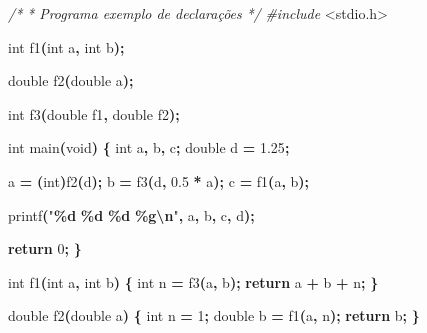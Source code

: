 \documentclass[
  11pt,
  a4paper,
]{scrbook}
\newenvironment{Shaded}{\begin{snugshade}}{\end{snugshade}}
\newcommand{\CommentTok}[1]{\textcolor[rgb]{0.56,0.35,0.01}{\textit{#1}}}
\newcommand{\ControlFlowTok}[1]{\textcolor[rgb]{0.13,0.29,0.53}{\textbf{#1}}}
\newcommand{\DataTypeTok}[1]{\textcolor[rgb]{0.13,0.29,0.53}{#1}}
\newcommand{\DecValTok}[1]{\textcolor[rgb]{0.00,0.00,0.81}{#1}}
\newcommand{\FloatTok}[1]{\textcolor[rgb]{0.00,0.00,0.81}{#1}}
\newcommand{\ImportTok}[1]{#1}
\newcommand{\NormalTok}[1]{#1}
\newcommand{\OperatorTok}[1]{\textcolor[rgb]{0.81,0.36,0.00}{\textbf{#1}}}
\newcommand{\PreprocessorTok}[1]{\textcolor[rgb]{0.56,0.35,0.01}{\textit{#1}}}
\newcommand{\SpecialCharTok}[1]{\textcolor[rgb]{0.81,0.36,0.00}{\textbf{#1}}}
\newcommand{\StringTok}[1]{\textcolor[rgb]{0.31,0.60,0.02}{#1}}
\begin{document}
\begin{Shaded}
\begin{Highlighting}[]
\CommentTok{/*}
\CommentTok{ * Programa exemplo de declarações}
\CommentTok{ */}
\PreprocessorTok{\#include }\ImportTok{\textless{}stdio.h\textgreater{}}

\DataTypeTok{int}\NormalTok{ f1}\OperatorTok{(}\DataTypeTok{int}\NormalTok{ a}\OperatorTok{,} \DataTypeTok{int}\NormalTok{ b}\OperatorTok{);}

\DataTypeTok{double}\NormalTok{ f2}\OperatorTok{(}\DataTypeTok{double}\NormalTok{ a}\OperatorTok{);}

\DataTypeTok{int}\NormalTok{ f3}\OperatorTok{(}\DataTypeTok{double}\NormalTok{ f1}\OperatorTok{,} \DataTypeTok{double}\NormalTok{ f2}\OperatorTok{);}

\DataTypeTok{int}\NormalTok{ main}\OperatorTok{(}\DataTypeTok{void}\OperatorTok{)} \OperatorTok{\{}
    \DataTypeTok{int}\NormalTok{ a}\OperatorTok{,}\NormalTok{ b}\OperatorTok{,}\NormalTok{ c}\OperatorTok{;}
    \DataTypeTok{double}\NormalTok{ d }\OperatorTok{=} \FloatTok{1.25}\OperatorTok{;}

\NormalTok{    a }\OperatorTok{=} \OperatorTok{(}\DataTypeTok{int}\OperatorTok{)}\NormalTok{f2}\OperatorTok{(}\NormalTok{d}\OperatorTok{);}
\NormalTok{    b }\OperatorTok{=}\NormalTok{ f3}\OperatorTok{(}\NormalTok{d}\OperatorTok{,} \FloatTok{0.5} \OperatorTok{*}\NormalTok{ a}\OperatorTok{);}
\NormalTok{    c }\OperatorTok{=}\NormalTok{ f1}\OperatorTok{(}\NormalTok{a}\OperatorTok{,}\NormalTok{ b}\OperatorTok{);}

\NormalTok{    printf}\OperatorTok{(}\StringTok{"}\SpecialCharTok{\%d}\StringTok{ }\SpecialCharTok{\%d}\StringTok{ }\SpecialCharTok{\%d}\StringTok{ }\SpecialCharTok{\%g\textbackslash{}n}\StringTok{"}\OperatorTok{,}\NormalTok{ a}\OperatorTok{,}\NormalTok{ b}\OperatorTok{,}\NormalTok{ c}\OperatorTok{,}\NormalTok{ d}\OperatorTok{);}

    \ControlFlowTok{return} \DecValTok{0}\OperatorTok{;}
\OperatorTok{\}}

\DataTypeTok{int}\NormalTok{ f1}\OperatorTok{(}\DataTypeTok{int}\NormalTok{ a}\OperatorTok{,} \DataTypeTok{int}\NormalTok{ b}\OperatorTok{)} \OperatorTok{\{}
    \DataTypeTok{int}\NormalTok{ n }\OperatorTok{=}\NormalTok{ f3}\OperatorTok{(}\NormalTok{a}\OperatorTok{,}\NormalTok{ b}\OperatorTok{);}
    \ControlFlowTok{return}\NormalTok{ a }\OperatorTok{+}\NormalTok{ b }\OperatorTok{+}\NormalTok{ n}\OperatorTok{;}
\OperatorTok{\}}

\DataTypeTok{double}\NormalTok{ f2}\OperatorTok{(}\DataTypeTok{double}\NormalTok{ a}\OperatorTok{)} \OperatorTok{\{}
    \DataTypeTok{int}\NormalTok{ n }\OperatorTok{=} \DecValTok{1}\OperatorTok{;}
    \DataTypeTok{double}\NormalTok{ b }\OperatorTok{=}\NormalTok{ f1}\OperatorTok{(}\NormalTok{a}\OperatorTok{,}\NormalTok{ n}\OperatorTok{);}
    \ControlFlowTok{return}\NormalTok{ b}\OperatorTok{;}
\OperatorTok{\}}


\end{Highlighting}
\end{Shaded}
\end{document}
